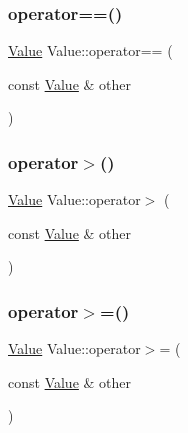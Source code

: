 \mbox{\label{classValue_a872c51bf32543279f522426527b4c857}} 
\subsubsection{\texorpdfstring{operator==()}{operator==()}}
{\footnotesize\ttfamily \hyperlink{classValue}{Value} Value\+::operator== (\begin{DoxyParamCaption}\item[{const \hyperlink{classValue}{Value} \&}]{other }\end{DoxyParamCaption})}

\mbox{\label{classValue_a05800a20d5b799d1a81b28c950899aea}} 
\subsubsection{\texorpdfstring{operator$>$()}{operator>()}}
{\footnotesize\ttfamily \hyperlink{classValue}{Value} Value\+::operator$>$ (\begin{DoxyParamCaption}\item[{const \hyperlink{classValue}{Value} \&}]{other }\end{DoxyParamCaption})}

\mbox{\label{classValue_a85a296609b51245c4aec34ebf206a66d}} 
\subsubsection{\texorpdfstring{operator$>$=()}{operator>=()}}
{\footnotesize\ttfamily \hyperlink{classValue}{Value} Value\+::operator$>$= (\begin{DoxyParamCaption}\item[{const \hyperlink{classValue}{Value} \&}]{other }\end{DoxyParamCaption})}

\mbox{\label{classValue_a2bb40009194bb698b113dc71154d888a}} 
